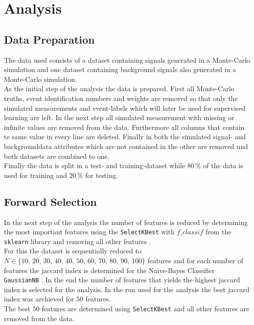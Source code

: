 \section{Analysis}\label{sec:Analysis}

\subsection{Data Preparation}

The data used consists of a dataset containing signals generated in a Monte-Carlo simulation and one dataset containing 
background signals also generated in a Monte-Carlo simulation. \\
As the initial step of the analysis the data is prepared.
First all Monte-Carlo truths, event identification numbers and weights are removed so that only the simulated measurements and
event-labels which will later be used for supervised learning are left. In the next step all simulated measurement with missing or
infinite values are removed from the data. Furthermore all columns that contain te same value in every line are deleted.
Finally in both the simulated signal- and backgrounddata attributes which are not contained in the other are removed und
both datasets are combined to one. \\
Finally the data is split in a test- and training-dataset while $80 \, \%$ of the data is used for training and $20 \,\%$
for testing.

\subsection{Forward Selection}

In the next step of the analysis the number of features is reduced by determining the most important features using
the \texttt{SelectKBest} with \texttt{$f\_classif$} from the \texttt{sklearn} library and removing all other features \cite{scikit-learn}. \\
For this the dataset is sequentially reduced to \\
$N \in \{ 10, \, 20, \, 30, \, 40, \, 40, \, 50, \, 60, \, 70, \, 80, \, 90, \, 100 \}$
features and for each number of features the jaccard index is determined for the Naive-Bayes Classifier \texttt{GaussianNB} \cite{scikit-learn}.
In the end the number of features that yields the highest jaccard index is selected for the analysis.
In the run used for the analysis the best jaccard index was archieved for $50$ features. \\
The best $50$ features are determined using \texttt{SelectKBest} and all other features are removed from the data.

